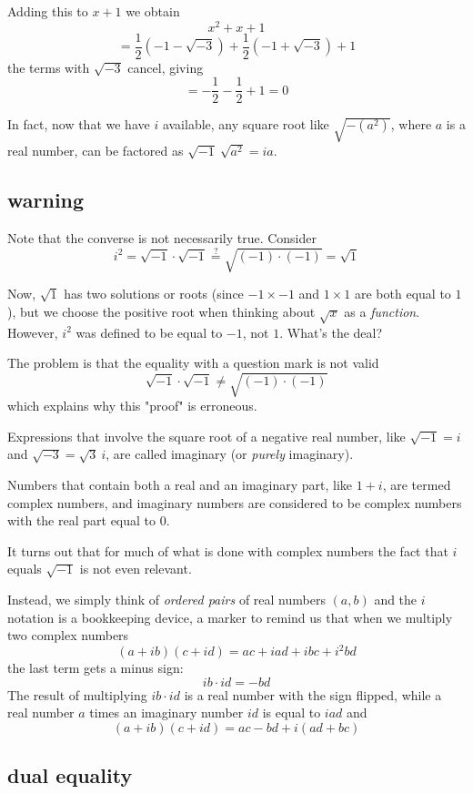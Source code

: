 \documentclass[11pt, oneside]{article}
\begin{document}
Adding this to $x+1$ we obtain
\[ x^2 + x + 1 \]
\[ = \frac{1}{2} (-1 - \sqrt{-3}) +  \frac{1}{2} (-1 + \sqrt{-3}) + 1 \]
the terms with $\sqrt{-3}$ cancel, giving
\[ = -\frac{1}{2} - \frac{1}{2} + 1 = 0 \]

In fact, now that we have $i$ available, any square root like $\sqrt{-(a^2)}$, where $a$ is a real number, can be factored as $\sqrt{-1} \ \sqrt{a^2} = ia$.

\subsection*{warning}

Note that the converse is not necessarily true.  Consider
\[ i^2 = \sqrt{-1} \cdot \sqrt{-1} \stackrel{?}{=} \sqrt{(-1)\cdot (-1)} = \sqrt{1} \]

Now, $\sqrt{1}$ has two solutions or roots (since $-1 \times -1$ and $1 \times 1$ are both equal to $1$), but we choose the positive root when thinking about $\sqrt{x}$ as a \emph{function}.  However, $i^2$ was defined to be equal to $-1$, not $1$.  What's the deal?

The problem is that the equality with a question mark is not valid
\[ \sqrt{-1} \cdot \sqrt{-1} \ne \sqrt{(-1)\cdot (-1)} \]
which explains why this "proof" is erroneous.

Expressions that involve the square root of a negative real number, like $\sqrt{-1} = i$ and $\sqrt{-3} = \sqrt{3}\ i$, are called imaginary (or \emph{purely} imaginary).  

Numbers that contain both a real and an imaginary part, like $1 + i$, are termed complex numbers, and imaginary numbers are considered to be complex numbers with the real part equal to $0$.

It turns out that for much of what is done with complex numbers the fact that $i$ equals $\sqrt{-1}$ is not even relevant.

Instead, we simply think of \emph{ordered pairs} of real numbers $(a,b)$ and the $i$ notation is a bookkeeping device, a marker to remind us that when we multiply two complex numbers
\[ (a + ib) (c + id) = ac + iad + ibc + i^2bd \]
the last term gets a minus sign:
\[ ib \cdot id = -bd \]
The result of multiplying $ib \cdot id$ is a real number with the sign flipped, while a real number $a$ times an imaginary number $id$ is equal to $iad$ and
\[ (a + ib) (c + id) = ac -bd + i(ad + bc) \]

\subsection*{dual equality}
\end{document}
